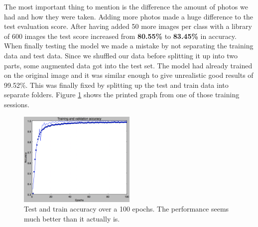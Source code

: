 The most important thing to mention is the difference the amount of photos we had and how they
were taken. Adding more photos made a huge difference to the test evaluation score.
After having added 50 more images per class with a library of 600 images the test score increased
from \textbf{80.55\%} to \textbf{83.45\%} in accuracy. \\

When finally testing the model we made a mistake by not separating the training data and test data.
Since we shuffled our data before splitting it up into two parts, some augmented data got into the
test set. The model had already trained on the original image and it was similar enough to
give unrealistic good results of 99.52\%. This was finally fixed by splitting up the test and train data 
into separate folders. Figure \ref{fig:augmentedtestdata} shows the printed graph from one of those
training sessions.

\begin{figure}[!hbtp]
\begin{center}
\includegraphics[width = 0.5\textwidth]{./Images/augmentedtestdata}
\caption{Test and train accuracy over a 100 epochs. The performance seems much better than it actually is.}
\label{fig:augmentedtestdata}
\end{center}
\end{figure}

